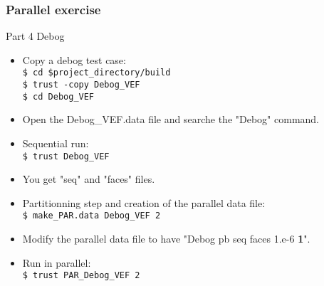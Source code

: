 \documentclass[10pt, hyperref={unicode=true,pdfusetitle, bookmarks=true,bookmarksnumbered=false,bookmarksopen=false, breaklinks=false,pdfborder={0 0 1},backref=true,colorlinks=true,linkcolor=darkblue,pageanchor, urlcolor=darkblue}]{beamer}
\begin{document}
\begin{frame}
\frametitle{Parallel exercise}
\begin{block}{Part 4 Debog}

\begin{itemize}
\item Copy a debog test case:\\
\texttt{\$ cd \$project\_directory/build }\\
\texttt{\$ trust -copy Debog\_VEF }\\
\texttt{\$ cd Debog\_VEF }\\
\item Open the Debog\_VEF.data file and searche the "Debog" command.
\item Sequential run:\\
\texttt{\$ trust Debog\_VEF }\\
\item You get "seq" and "faces" files.
\item Partitionning step and creation of the parallel data file:\\
\texttt{\$ make\_PAR.data Debog\_VEF 2 }\\
\item Modify the parallel data file to have "Debog pb seq faces 1.e-6 \textbf{1}".
\item Run in parallel:\\
\texttt{\$ trust PAR\_Debog\_VEF 2 }\\
\end{itemize}

\end{block}
\end{frame}
\end{document}
